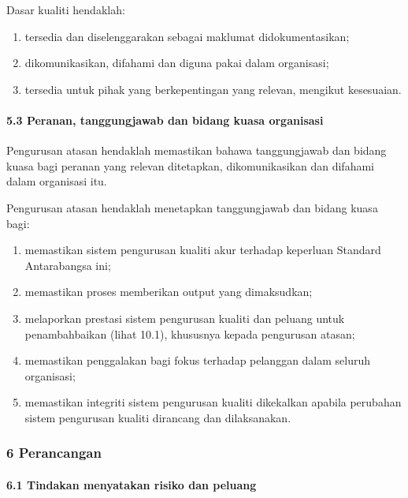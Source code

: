\documentclass[
]{article}
\begin{document}
Dasar kualiti hendaklah:

\begin{enumerate}
\def\labelenumi{\alph{enumi})}
\item
  tersedia dan diselenggarakan sebagai maklumat didokumentasikan;
\item
  dikomunikasikan, difahami dan diguna pakai dalam organisasi;
\item
  tersedia untuk pihak yang berkepentingan yang relevan, mengikut
  kesesuaian.
\end{enumerate}

\hypertarget{peranan-tanggungjawab-dan-bidang-kuasa-organisasi}{%
\paragraph{5.3 Peranan, tanggungjawab dan bidang kuasa
organisasi}\label{peranan-tanggungjawab-dan-bidang-kuasa-organisasi}}

Pengurusan atasan hendaklah memastikan bahawa tanggungjawab dan bidang
kuasa bagi peranan yang relevan ditetapkan, dikomunikasikan dan difahami
dalam organisasi itu.

Pengurusan atasan hendaklah menetapkan tanggungjawab dan bidang kuasa
bagi:

\begin{enumerate}
\def\labelenumi{\alph{enumi})}
\item
  memastikan sistem pengurusan kualiti akur terhadap keperluan Standard
  Antarabangsa ini;
\item
  memastikan proses memberikan output yang dimaksudkan;
\item
  melaporkan prestasi sistem pengurusan kualiti dan peluang untuk
  penambahbaikan (lihat 10.1), khususnya kepada pengurusan atasan;
\item
  memastikan penggalakan bagi fokus terhadap pelanggan dalam seluruh
  organisasi;
\item
  memastikan integriti sistem pengurusan kualiti dikekalkan apabila
  perubahan sistem pengurusan kualiti dirancang dan dilaksanakan.
\end{enumerate}

\hypertarget{perancangan}{%
\subsubsection{6 Perancangan}\label{perancangan}}

\hypertarget{tindakan-menyatakan-risiko-dan-peluang}{%
\paragraph{6.1 Tindakan menyatakan risiko dan
peluang}\label{tindakan-menyatakan-risiko-dan-peluang}}
\end{document}
